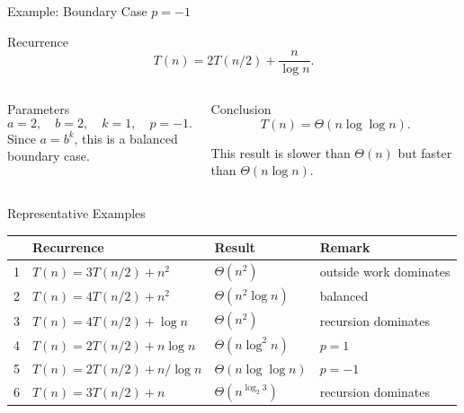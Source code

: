\documentclass[aspectratio=169]{beamer}
\begin{document}
\begin{frame}{Example: Boundary Case $p=-1$}
  \small
  \begin{block}{Recurrence}
    \[
      T(n)=2T(n/2)+\frac{n}{\log n}.
    \]
  \end{block}
  \begin{columns}[T]
    \begin{column}{0.49\textwidth}
      \begin{exampleblock}{Parameters}
        \[
          a=2,
          \quad b=2,
          \quad k=1,
          \quad p=-1.
        \]
        Since $a=b^k$, this is a balanced boundary case.
      \end{exampleblock}
    \end{column}
    \begin{column}{0.47\textwidth}
      \begin{alertblock}{Conclusion}
        \[
          T(n)=\Theta(n\log\log n).
        \]
      \end{alertblock}
      \begin{tcolorbox}[colframe=orange!85!black,colback=SoftOrange!35,arc=1.5mm]
        \small
        This result is slower than $\Theta(n)$ but faster than $\Theta(n\log n)$.
      \end{tcolorbox}
    \end{column}
  \end{columns}
\end{frame}

\begin{frame}{Representative Examples}
  \scriptsize
  \begin{center}
    \renewcommand{\arraystretch}{1.18}
    \begin{tabular}{c|L{0.40\textwidth}|L{0.22\textwidth}|L{0.18\textwidth}}
      \toprule
      & \textbf{Recurrence} & \textbf{Result} & \textbf{Remark} \\
       & $T(n)=3T(n/2)+n^2$ & $\Theta(n^2)$ & outside work dominates \\
      2 & $T(n)=4T(n/2)+n^2$ & $\Theta(n^2\log n)$ & balanced \\
      3 & $T(n)=4T(n/2)+\log n$ & $\Theta(n^2)$ & recursion dominates \\
      4 & $T(n)=2T(n/2)+n\log n$ & $\Theta(n\log^2 n)$ & $p=1$ \\
      5 & $T(n)=2T(n/2)+n/\log n$ & $\Theta(n\log\log n)$ & $p=-1$ \\
      6 & $T(n)=3T(n/2)+n$ & $\Theta(n^{\log_2 3})$ & recursion dominates \\
      \bottomrule
    \end{tabular}
  \end{center}
\end{frame}
\end{document}
